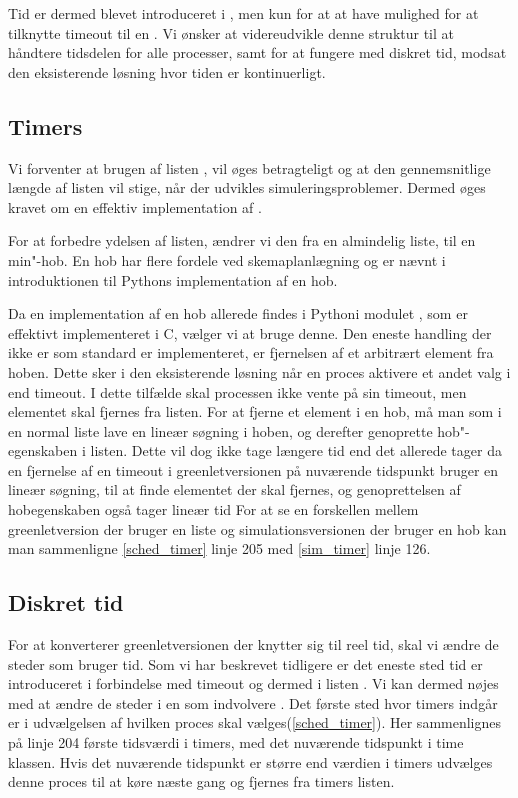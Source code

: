 Tid er dermed blevet introduceret i \pycsp, men kun for at at have
mulighed for at tilknytte timeout til en . Vi ønsker
at videreudvikle denne struktur til at håndtere tidsdelen for alle
processer, samt for at fungere med diskret tid, modsat den eksisterende
løsning hvor tiden er kontinuerligt.

\subsection{Timers}  
Vi forventer at brugen af
listen , vil øges betragteligt og at den gennemsnitlige
længde af listen vil stige, når der udvikles simuleringsproblemer. Dermed 
øges kravet om en effektiv implementation af . 

For at forbedre ydelsen af  listen, 
ændrer vi den fra en almindelig liste, til en min"-hob. En hob har
flere fordele ved skemaplanlægning og er nævnt i introduktionen til Pythons implementation af en hob. 

Da en implementation af en hob
allerede findes i Pythoni modulet , som er effektivt implementeret i C, vælger vi at bruge denne. Den eneste handling
der ikke er som standard er implementeret, er fjernelsen af et arbitrært element
fra hoben. Dette sker i den eksisterende løsning når en proces
aktivere et andet valg i  end timeout. I dette tilfælde skal
processen ikke vente på sin timeout, men elementet skal fjernes fra
 listen. For at fjerne et element i en hob, må man som i
en normal liste lave en lineær søgning i hoben, og derefter genoprette
hob"-egenskaben i listen. Dette vil dog ikke tage længere tid end det
allerede tager da en fjernelse af en timeout i greenletversionen på nuværende
tidspunkt bruger en lineær søgning, til at finde elementet der skal
fjernes, og genoprettelsen af hobegenskaben også tager lineær tid For at se en forskellen mellem greenletversion der bruger en liste og simulationsversionen der bruger en hob kan man sammenligne \cref{sched_timer} linje 205 med \cref{sim_timer} linje 126.


\subsection{Diskret tid} For at konverterer greenletversionen der knytter sig til reel tid, skal vi ændre de steder som bruger tid. Som vi har beskrevet tidligere er det eneste sted tid er introduceret i forbindelse med timeout og dermed i listen . Vi kan dermed nøjes med at ændre de steder i \sched en som indvolvere . Det første sted hvor timers indgår er i udvælgelsen af hvilken proces skal vælges(\cref{sched_timer}). Her sammenlignes på linje 204  første tidsværdi i timers, med det nuværende tidspunkt i time klassen. Hvis det nuværende tidspunkt er større end værdien i timers udvælges denne proces til at køre næste gang og fjernes fra timers listen.

